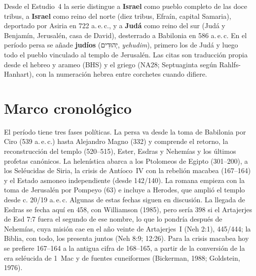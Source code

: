 \documentclass[11pt,letterpaper]{article}
\newcommand{\heb}[1]{\mbox{\foreignlanguage{hebrew}{#1}}}
\begin{document}
\begin{nota}
Desde el Estudio~4 la serie distingue a \textbf{Israel} como pueblo completo de las doce tribus, a \textbf{Israel} como reino del norte (diez tribus, Efraín, capital Samaria), deportado por Asiria en 722 a.\,e.\,c., y a \textbf{Judá} como reino del sur (Judá y Benjamín, Jerusalén, casa de David), desterrado a Babilonia en 586 a.\,e.\,c. En el período persa se añade \textbf{judíos} (\heb{יְהוּדִים}, \emph{yehudim}), primero los de Judá y luego todo el pueblo vinculado al templo de Jerusalén. Las citas son traducción propia desde el hebreo y arameo (BHS) y el griego (NA28; Septuaginta según Rahlfs-Hanhart), con la numeración hebrea entre corchetes cuando difiere.
\end{nota}

\section{Marco cronológico}

El período tiene tres fases políticas. La persa va desde la toma de Babilonia por Ciro (539 a.\,e.\,c.) hasta Alejandro Magno (332) y comprende el retorno, la reconstrucción del templo (520--515), Ester, Esdras y Nehemías y los últimos profetas canónicos. La helenística abarca a los Ptolomeos de Egipto (301--200), a los Seléucidas de Siria, la crisis de Antíoco~IV con la rebelión macabea (167--164) y el Estado asmoneo independiente (desde 142/140). La romana empieza con la toma de Jerusalén por Pompeyo (63) e incluye a Herodes, que amplió el templo desde c. 20/19 a.\,e.\,c. Algunas de estas fechas siguen en discusión. La llegada de Esdras se fecha aquí en 458, con Williamson (1985), pero sería 398 si el Artajerjes de Esd 7:7 fuera el segundo de ese nombre, lo que lo pondría después de Nehemías, cuya misión cae en el año veinte de Artajerjes~I (Neh 2:1), 445/444; la Biblia, con todo, los presenta juntos (Neh 8:9; 12:26). Para la crisis macabea hoy se prefiere 167--164 a la antigua cifra de 168--165, a partir de la conversión de la era seléucida de 1~Mac y de fuentes cuneiformes (Bickerman, 1988; Goldstein, 1976).
\end{document}
